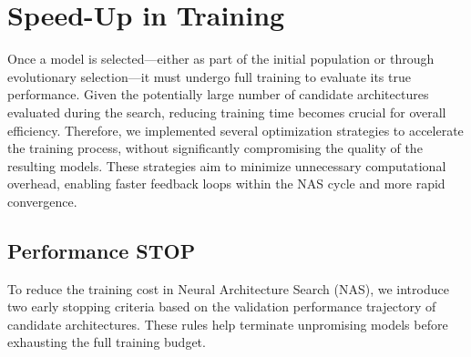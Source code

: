 \section{Speed-Up in Training}

Once a model is selected—either as part of the initial population or through evolutionary selection—it must undergo full training to evaluate its true performance. Given the potentially large number of candidate architectures evaluated during the search, reducing training time becomes crucial for overall efficiency. Therefore, we implemented several optimization strategies to accelerate the training process, without significantly compromising the quality of the resulting models. These strategies aim to minimize unnecessary computational overhead, enabling faster feedback loops within the NAS cycle and more rapid convergence.

\subsection{Performance STOP}
\label{sec:performance_stop}
To reduce the training cost in Neural Architecture Search (NAS), we introduce two early stopping criteria based on the validation performance trajectory of candidate architectures. These rules help terminate unpromising models before exhausting the full training budget.

